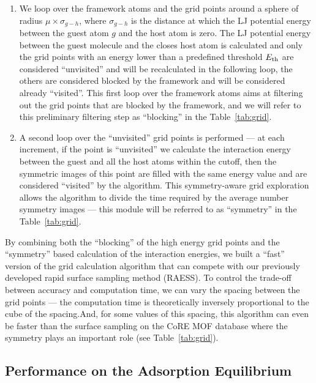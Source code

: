\documentclass[main]{subfiles}
\begin{document}
\begin{enumerate}
  \item We loop over the framework atoms and the grid points around a sphere of radius $\mu\times\sigma_{g-h}$, where $\sigma_{g-h}$ is the distance at which the LJ potential energy between the guest atom $g$ and the host atom is zero. The LJ potential energy between the guest molecule and the closes host atom is calculated and only the grid points with an energy lower than a predefined threshold $E_{\text{th}}$ are considered ``unvisited'' and will be recalculated in the following loop, the others are considered blocked by the framework and will be considered already ``visited''. This first loop over the framework atoms aims at filtering out the grid points that are blocked by the framework, and we will refer to this preliminary filtering step as ``blocking'' in the Table~\ref{tab:grid}.
  \item A second loop over the ``unvisited'' grid points is performed --- at each increment, if the point is ``unvisited'' we calculate the interaction energy between the guest and all the host atoms within the cutoff, then the symmetric images of this point are filled with the same energy value and are considered ``visited'' by the algorithm. This symmetry-aware grid exploration allows the algorithm to divide the time required by the average number symmetry images --- this module will be referred to as ``symmetry'' in the Table~\ref{tab:grid}.
\end{enumerate}

By combining both the ``blocking'' of the high energy grid points and the ``symmetry'' based calculation of the interaction energies, we built a ``fast'' version of the grid calculation algorithm that can compete with our previously developed rapid surface sampling method (RAESS). To control the trade-off between accuracy and computation time, we can vary the spacing between the grid points --- the computation time is theoretically inversely proportional to the cube of the spacing.And, for some values of this spacing, this algorithm can even be faster than the surface sampling on the CoRE MOF database where the symmetry plays an important role (see Table~\ref{tab:grid}). 

\subsection{Performance on the Adsorption Equilibrium}
\end{document}
